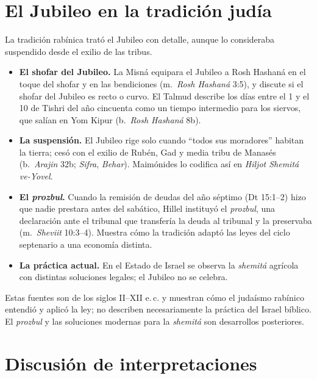\documentclass[11pt,letterpaper]{article}
\begin{document}
\section{El Jubileo en la tradición judía}

La tradición rabínica trató el Jubileo con detalle, aunque lo consideraba suspendido desde el exilio de las tribus.
\begin{itemize}\setlength{\itemsep}{1pt}
\item \textbf{El shofar del Jubileo.} La Misná equipara el Jubileo a Rosh Hashaná en el toque del shofar y en las bendiciones (m.~\emph{Rosh Hashaná} 3:5), y discute si el shofar del Jubileo es recto o curvo. El Talmud describe los días entre el 1 y el 10 de Tishri del año cincuenta como un tiempo intermedio para los siervos, que salían en Yom Kipur (b.~\emph{Rosh Hashaná} 8b).
\item \textbf{La suspensión.} El Jubileo rige solo cuando ``todos sus moradores'' habitan la tierra; cesó con el exilio de Rubén, Gad y media tribu de Manasés (b.~\emph{Arajin} 32b; \emph{Sifra}, \emph{Behar}). Maimónides lo codifica así en \emph{Hiljot Shemitá ve-Yovel}.
\item \textbf{El \emph{prozbul}.} Cuando la remisión de deudas del año séptimo (Dt 15:1--2) hizo que nadie prestara antes del sabático, Hillel instituyó el \emph{prozbul}, una declaración ante el tribunal que transfería la deuda al tribunal y la preservaba (m.~\emph{Sheviit} 10:3--4). Muestra cómo la tradición adaptó las leyes del ciclo septenario a una economía distinta.
\item \textbf{La práctica actual.} En el Estado de Israel se observa la \emph{shemitá} agrícola con distintas soluciones legales; el Jubileo no se celebra.
\end{itemize}

\begin{nota}[Precisión]
Estas fuentes son de los siglos II--XII e.\,c. y muestran cómo el judaísmo rabínico entendió y aplicó la ley; no describen necesariamente la práctica del Israel bíblico. El \emph{prozbul} y las soluciones modernas para la \emph{shemitá} son desarrollos posteriores.
\end{nota}

\section{Discusión de interpretaciones}
\end{document}
